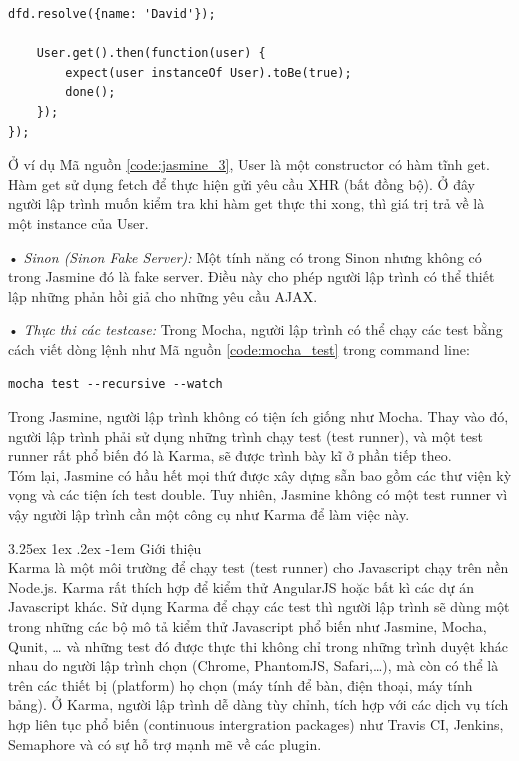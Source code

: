 \documentclass[12pt,a4paper]{article}
\makeatletter
\let\newcounter\@gobble\let\setcounter\@gobbletwo
\newcommand{\myparagraph}[1]{\paragraph{#1}\mbox{}\\} %
\newcounter{subsubsubsection}[subsubsection]
\renewcommand\paragraph{\@startsection{paragraph}{5}{\z@}%
  {3.25ex \@plus1ex \@minus.2ex}%
  {-1em}%
  {\normalfont\normalsize\bfseries}}
\makeatother
\begin{document}
\begin{list}{}{}
\begin{lstlisting}[caption=Ví dụ sử dụng Jasmine để kiểm thử bất đồng bộ,label={code:jasmine_3}]
	dfd.resolve({name: 'David'});
	
	User.get().then(function(user) {
		expect(user instanceOf User).toBe(true);
		done();
	});
});
\end{lstlisting}

Ở ví dụ Mã nguồn \ref{code:jasmine_3}, User là một constructor có hàm tĩnh get. Hàm get sử dụng fetch để thực hiện gửi yêu cầu XHR (bất đồng bộ). Ở đây người lập trình muốn kiểm tra khi hàm get thực thi xong, thì giá trị trả về là một instance của User.

\item[•] \emph{Sinon (Sinon Fake Server):}
Một tính năng có trong Sinon nhưng không có trong Jasmine đó là fake server. Điều này cho phép người lập trình có thể thiết lập những phản hồi giả cho những yêu cầu AJAX.

\item[•] \emph{Thực thi các testcase:}
Trong Mocha, người lập trình có thể chạy các test bằng cách viết dòng lệnh như Mã nguồn \ref{code:mocha_test} trong command line:

\begin{lstlisting}[caption=Khởi chạy trình kiểm thử testcase với Mocha,label={code:mocha_test}]
mocha test --recursive --watch
\end{lstlisting}

Trong Jasmine, người lập trình không có tiện ích giống như Mocha. Thay vào đó, người lập trình phải sử dụng những trình chạy test (test runner), và một test runner rất phổ biến đó là Karma, sẽ được trình bày kĩ ở phần tiếp theo.
\\

Tóm lại, Jasmine có hầu hết mọi thứ được xây dựng sẵn bao gồm các thư viện kỳ vọng và các tiện ích test double. Tuy nhiên, Jasmine không có một test runner vì vậy người lập trình cần một công cụ như Karma để làm việc này.
\end{list}


\myparagraph{Giới thiệu}
Karma là một môi trường để chạy test (test runner) cho Javascript chạy trên nền Node.js. Karma rất thích hợp để kiểm thử AngularJS hoặc bất kì các dự án Javascript khác. Sử dụng Karma để chạy các test thì người lập trình sẽ dùng một trong những các bộ mô tả kiểm thử Javascript phổ biến như Jasmine, Mocha, Qunit, … và những test đó được thực thi không chỉ trong những trình duyệt khác nhau do người lập trình chọn (Chrome, PhantomJS, Safari,…), mà còn có thể là trên các thiết bị (platform) họ chọn (máy tính để bàn, điện thoại, máy tính bảng). Ở Karma, người lập trình dễ dàng tùy chỉnh, tích hợp với các dịch vụ tích hợp liên tục phổ biến (continuous intergration packages) như Travis CI, Jenkins, Semaphore và có sự hỗ trợ mạnh mẽ về các plugin.
\end{document}
